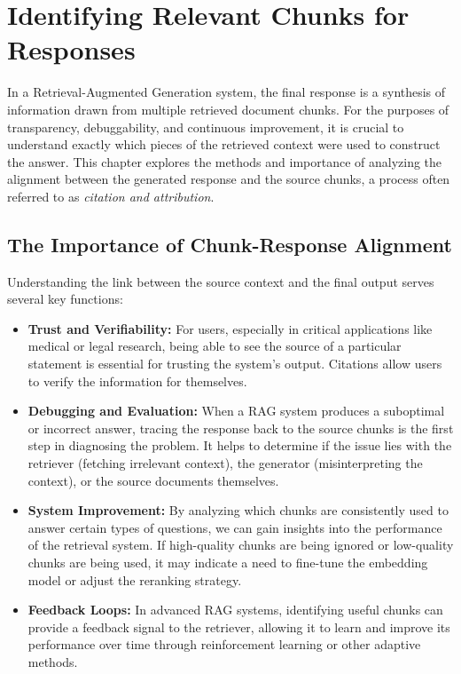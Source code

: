 \chapter{Identifying Relevant Chunks for Responses}
\label{chap:relevant_chunks}

In a Retrieval-Augmented Generation system, the final response is a synthesis of information drawn from multiple retrieved document chunks. For the purposes of transparency, debuggability, and continuous improvement, it is crucial to understand exactly which pieces of the retrieved context were used to construct the answer. This chapter explores the methods and importance of analyzing the alignment between the generated response and the source chunks, a process often referred to as \textit{citation and attribution}.

\section{The Importance of Chunk-Response Alignment}
Understanding the link between the source context and the final output serves several key functions:
\begin{itemize}
    \item \textbf{Trust and Verifiability:} For users, especially in critical applications like medical or legal research, being able to see the source of a particular statement is essential for trusting the system's output. Citations allow users to verify the information for themselves.
    \item \textbf{Debugging and Evaluation:} When a RAG system produces a suboptimal or incorrect answer, tracing the response back to the source chunks is the first step in diagnosing the problem. It helps to determine if the issue lies with the retriever (fetching irrelevant context), the generator (misinterpreting the context), or the source documents themselves.
    \item \textbf{System Improvement:} By analyzing which chunks are consistently used to answer certain types of questions, we can gain insights into the performance of the retrieval system. If high-quality chunks are being ignored or low-quality chunks are being used, it may indicate a need to fine-tune the embedding model or adjust the reranking strategy.
    \item \textbf{Feedback Loops:} In advanced RAG systems, identifying useful chunks can provide a feedback signal to the retriever, allowing it to learn and improve its performance over time through reinforcement learning or other adaptive methods.
\end{itemize}

